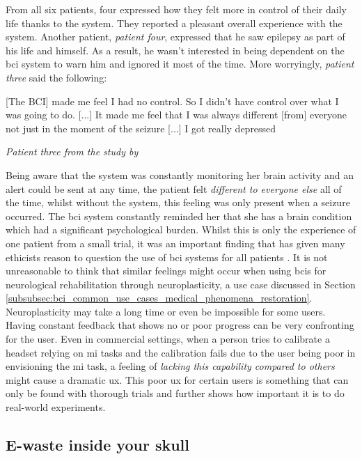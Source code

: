 From all six patients, four expressed how they felt more in control of their daily life thanks to the system.
They reported a pleasant overall experience with the system.
Another patient, \textit{patient four}, expressed that he saw epilepsy as part of his life and himself.
As a result, he wasn't interested in being dependent on the \gls{bci} system to warn him and ignored it most of the time.
More worryingly, \textit{patient three} said the following: 

\setlength{\epigraphwidth}{0.9\textwidth}
\epigraph{[The BCI] made me feel I had no control. So I didn't have control over what I was going to do. [...]  It made me feel that I was always different [from] everyone not just in the moment of the seizure [...] I got really depressed}{\textit{Patient three from the study by \citet{first_bci_trial}}}

Being aware that the system was constantly monitoring her brain activity and an alert could be sent at any time, the patient felt \textit{different to everyone else} all of the time, whilst without the system, this feeling was only present when a seizure occurred.
The \gls{bci} system constantly reminded her that she has a brain condition which had a significant psychological burden.
Whilst this is only the experience of one patient from a small trial, it was an important finding that has given many ethicists reason to question the use of \gls{bci} systems for all patients \citep{ethics_of_bci}.
It is not unreasonable to think that similar feelings might occur when using \glspl{bci} for neurological rehabilitation through neuroplasticity, a use case discussed in Section \ref{subsubsec:bci_common_use_cases_medical_phenomena_restoration}.
Neuroplasticity may take a long time or even be impossible for some users.
Having constant feedback that shows no or poor progress can be very confronting for the user.
Even in commercial settings, when a person tries to calibrate a headset relying on \gls{mi} tasks and the calibration fails due to the user being poor in envisioning the \gls{mi} task, a feeling of \textit{lacking this capability compared to others} might cause a dramatic \gls{ux}.
This poor \gls{ux} for certain users is something that can only be found with thorough trials and further shows how important it is to do real-world experiments.


\subsection{E-waste inside your skull}
\label{subsec:bci_ethical_e_waste}

